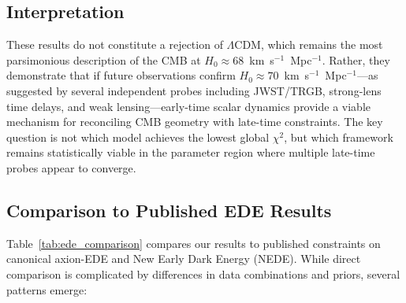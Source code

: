 \documentclass[a4paper,11pt]{article}
\begin{document}
\subsection*{Interpretation}

These results do not constitute a rejection of $\Lambda$CDM, which remains the most parsimonious description of the CMB at $H_0 \approx 68$~km~s$^{-1}$~Mpc$^{-1}$. Rather, they demonstrate that if future observations confirm $H_0 \approx 70$~km~s$^{-1}$~Mpc$^{-1}$---as suggested by several independent probes including JWST/TRGB, strong-lens time delays, and weak lensing---early-time scalar dynamics provide a viable mechanism for reconciling CMB geometry with late-time constraints. The key question is not which model achieves the lowest global $\chi^2$, but which framework remains statistically viable in the parameter region where multiple late-time probes appear to converge.

\subsection*{Comparison to Published EDE Results}

Table~\ref{tab:ede_comparison} compares our results to published constraints on canonical axion-EDE and New Early Dark Energy (NEDE). While direct comparison is complicated by differences in data combinations and priors, several patterns emerge:
\end{document}
